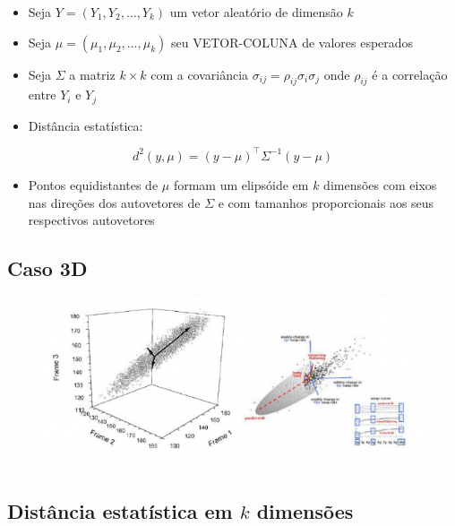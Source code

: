 \documentclass[
  letterpaper,
  DIV=11,
  numbers=noendperiod]{scrartcl}
\providecommand{\tightlist}{%
  \setlength{\itemsep}{0pt}\setlength{\parskip}{0pt}}\usepackage{longtable,booktabs,array}
\begin{document}
\begin{itemize}
\tightlist
\item
  Seja \(Y = (Y_1, Y_2, \ldots, Y_k)\) um vetor aleatório de dimensão
  \(k\)
\item
  Seja \(\mu = (\mu_1, \mu_2, \ldots, \mu_k)\) seu VETOR-COLUNA de
  valores esperados
\item
  Seja \(\Sigma\) a matriz \(k\times k\) com a covariância
  \(\sigma_{ij} = \rho_{ij}\sigma_i\sigma_j\) onde \(\rho_{ij}\) é a
  correlação entre \(Y_i\) e \(Y_j\)
\item
  Distância estatística:
\end{itemize}

\[ d^2(y,\mu) = (y-\mu)^\top \Sigma^{-1}(y-\mu)\]

\begin{itemize}
\tightlist
\item
  Pontos equidistantes de \(\mu\) formam um elipsóide em \(k\) dimensões
  com eixos nas direções dos autovetores de \(\Sigma\) e com tamanhos
  proporcionais aos seus respectivos autovetores
\end{itemize}

\hypertarget{caso-3d}{%
\subsection{Caso 3D}\label{caso-3d}}

\begin{figure}

{\centering \includegraphics[width=1\textwidth,height=\textheight]{figs/Aula07/3D.png}

}

\end{figure}

\hypertarget{distuxe2ncia-estatuxedstica-em-k-dimensuxf5es-1}{%
\subsection{\texorpdfstring{Distância estatística em \(k\)
dimensões}{Distância estatística em k dimensões}}\label{distuxe2ncia-estatuxedstica-em-k-dimensuxf5es-1}}
\end{document}
